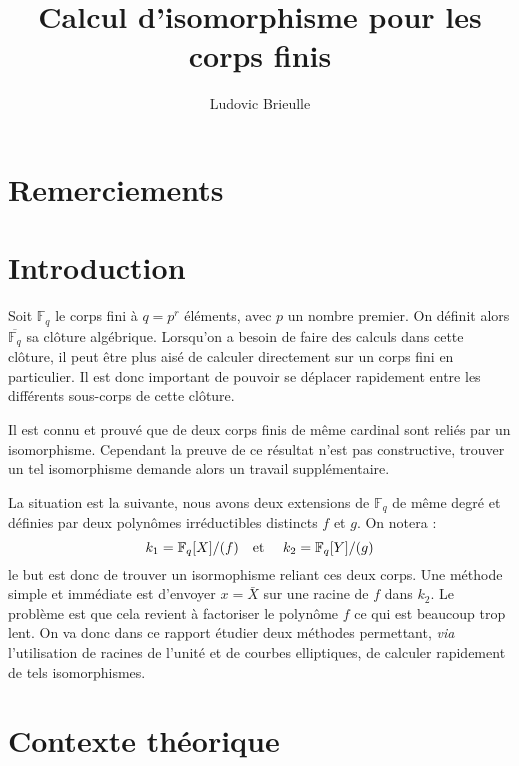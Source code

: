 \documentclass[a4paper]{article} %
\numberwithin{section}{part}
\numberwithin{equation}{section}
\newcommand\GF[1]{\mathbb{F}_{#1}}
\newcommand\etmath{\textup{\quad et \quad}}
\begin{document}
\title{Calcul d'isomorphisme pour les corps finis}
\author{Ludovic Brieulle}
\newtheorem{thm}{Thèorème}[section]
\newtheorem{lem}[thm]{Lemme}
\newtheorem{cor}{Corollaire}[thm]
\newtheorem{prop}[thm]{Proposition}
\theoremstyle{definition}
\newtheorem{defn}[thm]{Définition}
\newtheorem*{ex}{Exemple}
\theoremstyle{remark}
\newtheorem*{rem}{Remarque}

\maketitle
\part*{Remerciements}

\part*{Introduction}
Soit $\GF{q}$ le corps fini à $q = p^r$ éléments, avec $p$ un nombre premier. On
définit alors $\overline{\GF{q}}$ sa clôture algébrique. Lorsqu'on a besoin de
faire des calculs dans cette clôture, il peut être plus aisé de calculer
directement sur un corps fini en particulier. Il est donc important de pouvoir
se déplacer rapidement entre les différents sous-corps de cette clôture.\par
Il est connu et prouvé que de deux corps finis de même cardinal sont reliés par
un isomorphisme. Cependant la preuve de ce résultat n'est pas constructive,
trouver un tel isomorphisme demande alors un travail supplémentaire.\par
La situation est la suivante, nous avons deux extensions de $\GF{q}$ de même
degré et définies par deux polynômes irréductibles distincts $f$ et $g$. 
On notera :
\[k_1=\GF{q}[X]/(f)\etmath k_2=\GF{q}[Y]/(g)\]
le but est donc de trouver un isormophisme reliant ces deux corps. Une méthode
simple et immédiate est d'envoyer $x = \bar{X}$ sur une racine de $f$ dans
$k_2$. Le problème est que cela revient à factoriser le polynôme $f$ ce qui est
beaucoup trop lent.
On va donc dans ce rapport étudier deux méthodes permettant, \textit{via}
l'utilisation de racines de l'unité et de courbes elliptiques, de calculer
rapidement de tels isomorphismes. 

\newpage
{}
\tableofcontents
\newpage

\part{Contexte théorique}
\end{document}
